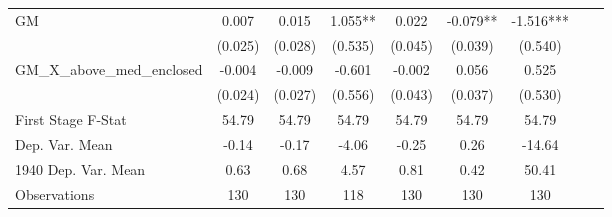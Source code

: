 \begin{tabular}{l*{8}{c}}
\cmidrule(lr){1-7}
GM              &    0.007   &    0.015   &    1.055** &    0.022   &   -0.079** &   -1.516***\\
                &  (0.025)   &  (0.028)   &  (0.535)   &  (0.045)   &  (0.039)   &  (0.540)   \\
\addlinespace
GM\_X\_above\_med\_enclosed&   -0.004   &   -0.009   &   -0.601   &   -0.002   &    0.056   &    0.525   \\
                &  (0.024)   &  (0.027)   &  (0.556)   &  (0.043)   &  (0.037)   &  (0.530)   \\
\midrule
First Stage F-Stat&    54.79   &    54.79   &    54.79   &    54.79   &    54.79   &    54.79   \\
Dep. Var. Mean  &    -0.14   &    -0.17   &    -4.06   &    -0.25   &     0.26   &   -14.64   \\
1940 Dep. Var. Mean&     0.63   &     0.68   &     4.57   &     0.81   &     0.42   &    50.41   \\
Observations    &      130   &      130   &      118   &      130   &      130   &      130   \\
 \bottomrule \end{tabular}
